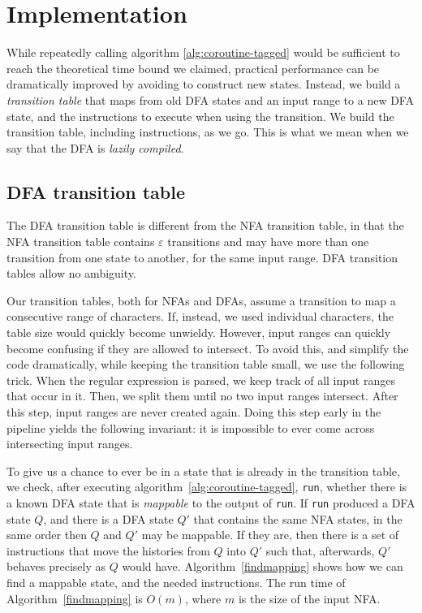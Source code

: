 \documentclass[11pt,a4paper,twoside,openright]{Thesis}
\theoremstyle{definition}
\begin{document}
\chapter{Implementation}
While repeatedly calling algorithm \ref{alg:coroutine-tagged} would be sufficient
to reach the theoretical time bound we claimed, practical performance
can be dramatically improved by avoiding to construct new states.
Instead, we build a \emph{transition table} that maps from old DFA
states and an input range to a new DFA state, and the instructions
to execute when using the transition. We build the transition table,
including instructions, as we go. This is what we mean when we say
that the DFA is \emph{lazily compiled}.

\section{DFA transition table}
The DFA transition table is different from the NFA transition table,
in that the NFA transition table contains $\varepsilon$ transitions and
may have more than one transition from one state to another, for
the same input range. DFA transition tables allow no ambiguity.

Our transition tables, both for NFAs and DFAs, assume a transition
to map a consecutive range of characters. If, instead, we used
individual characters, the table size would quickly become unwieldy.
However, input ranges can quickly become confusing if they are
allowed to intersect. To avoid this, and simplify the code dramatically,
while keeping the transition table small, we use the following
trick. When the regular expression is parsed, we keep track of all
input ranges that occur in it. Then, we split them until no two
input ranges intersect.  After this step, input ranges are never
created again.  Doing this step early in the pipeline yields the
following invariant: it is impossible to ever come across intersecting
input ranges.

To give us a chance to ever be in a state that is already in the
transition table, we check, after executing algorithm~\ref{alg:coroutine-tagged},
\texttt{run}, whether there is a known DFA state that is
\emph{mappable} to the output of \texttt{run}.  If \texttt{run}
produced a DFA state $Q$, and there is a DFA state $Q'$ that contains
the same NFA states, in the same order then $Q$ and $Q'$ may be
mappable.  If they are, then there is a set of instructions that
move the histories from $Q$ into $Q'$ such that, afterwards, $Q'$
behaves precisely as $Q$ would have. Algorithm~\ref{findmapping}
shows how we can find a mappable state, and the needed instructions.
The run time of Algorithm~\ref{findmapping} is $O(m)$, where $m$
is the size of the input NFA.
\end{document}
